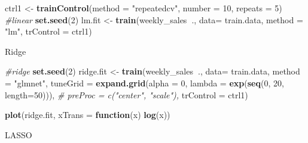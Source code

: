 \documentclass[]{article}
\newenvironment{Shaded}{\begin{snugshade}}{\end{snugshade}}
\newcommand{\CommentTok}[1]{\textcolor[rgb]{0.56,0.35,0.01}{\textit{#1}}}
\newcommand{\ControlFlowTok}[1]{\textcolor[rgb]{0.13,0.29,0.53}{\textbf{#1}}}
\newcommand{\DataTypeTok}[1]{\textcolor[rgb]{0.13,0.29,0.53}{#1}}
\newcommand{\DecValTok}[1]{\textcolor[rgb]{0.00,0.00,0.81}{#1}}
\newcommand{\KeywordTok}[1]{\textcolor[rgb]{0.13,0.29,0.53}{\textbf{#1}}}
\newcommand{\NormalTok}[1]{#1}
\newcommand{\OperatorTok}[1]{\textcolor[rgb]{0.81,0.36,0.00}{\textbf{#1}}}
\newcommand{\StringTok}[1]{\textcolor[rgb]{0.31,0.60,0.02}{#1}}
\begin{document}
\begin{Shaded}
\begin{Highlighting}[]
\NormalTok{ctrl1 <-}\StringTok{ }\KeywordTok{trainControl}\NormalTok{(}\DataTypeTok{method =} \StringTok{"repeatedcv"}\NormalTok{, }\DataTypeTok{number =} \DecValTok{10}\NormalTok{, }\DataTypeTok{repeats =} \DecValTok{5}\NormalTok{)}
\CommentTok{#linear }
\KeywordTok{set.seed}\NormalTok{(}\DecValTok{2}\NormalTok{)}
\NormalTok{lm.fit <-}\StringTok{ }\KeywordTok{train}\NormalTok{(weekly_sales}\OperatorTok{~}\NormalTok{.,}
                \DataTypeTok{data=}\NormalTok{ train.data,}
                \DataTypeTok{method =} \StringTok{"lm"}\NormalTok{,}
                \DataTypeTok{trControl =}\NormalTok{ ctrl1)}
\end{Highlighting}
\end{Shaded}

Ridge

\begin{Shaded}
\begin{Highlighting}[]
\CommentTok{#ridge}
\KeywordTok{set.seed}\NormalTok{(}\DecValTok{2}\NormalTok{)}
\NormalTok{ridge.fit <-}\StringTok{ }\KeywordTok{train}\NormalTok{(weekly_sales}\OperatorTok{~}\NormalTok{.,}
                   \DataTypeTok{data=}\NormalTok{ train.data,}
                   \DataTypeTok{method =} \StringTok{"glmnet"}\NormalTok{,}
                   \DataTypeTok{tuneGrid =} \KeywordTok{expand.grid}\NormalTok{(}\DataTypeTok{alpha =} \DecValTok{0}\NormalTok{, }
                                          \DataTypeTok{lambda =} \KeywordTok{exp}\NormalTok{(}\KeywordTok{seq}\NormalTok{(}\DecValTok{0}\NormalTok{, }\DecValTok{20}\NormalTok{, }\DataTypeTok{length=}\DecValTok{50}\NormalTok{))),}
                   \CommentTok{# preProc = c("center", "scale"),}
                   \DataTypeTok{trControl =}\NormalTok{ ctrl1)}

\KeywordTok{plot}\NormalTok{(ridge.fit, }\DataTypeTok{xTrans =} \ControlFlowTok{function}\NormalTok{(x) }\KeywordTok{log}\NormalTok{(x))}
\end{Highlighting}
\end{Shaded}

LASSO
\end{document}
